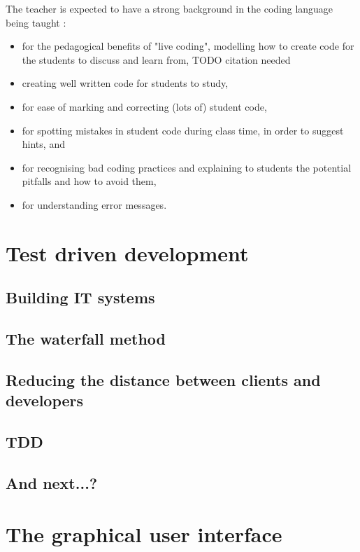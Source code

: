 \documentclass[10pt]{article}
\begin{document}
The teacher is expected to have a strong background in the coding language being taught :
\begin{itemize}
\item for the pedagogical benefits of "live coding", modelling how to create code for the students to discuss and learn from, TODO citation needed
\item creating well written code for students to study,
\item for ease of marking and correcting (lots of) student code,
\item for spotting mistakes in student code during class time, in order to suggest hints, and
\item for recognising bad coding practices and explaining to students the potential pitfalls and how to avoid them,
\item for understanding error messages.
\end{itemize}





\section{Test driven development} \label{tdd}

\subsection{Building IT systems}

\subsection{The waterfall method}

\subsection{Reducing the distance between clients and developers}

\subsection{TDD}

\subsection{And next...?}






\section{The graphical user interface} \label{gui}
\end{document}
